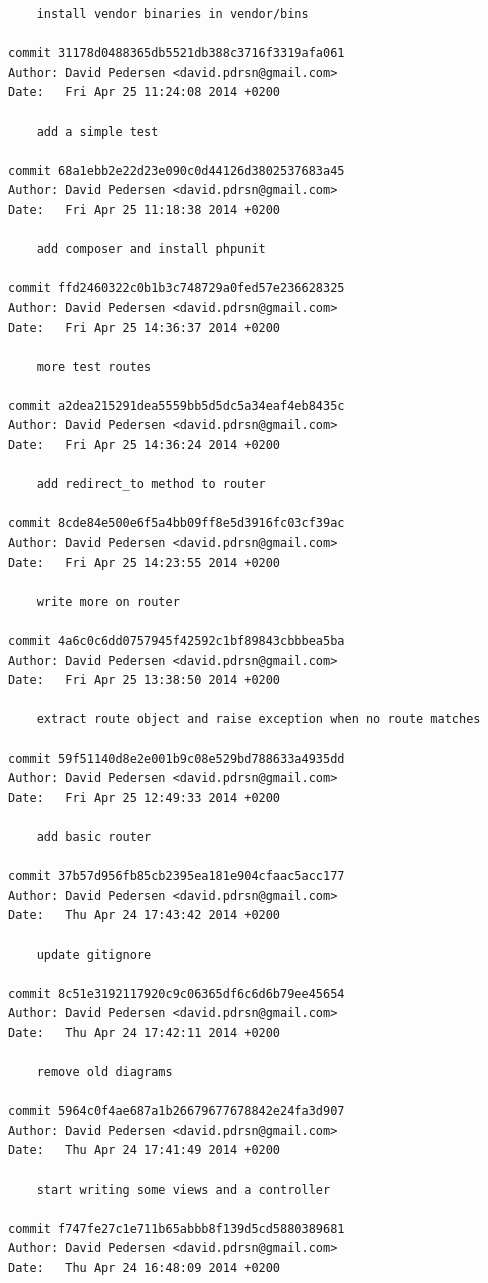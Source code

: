 \documentclass[12pt]{article}
\begin{document}
\begin{verbatim}
    install vendor binaries in vendor/bins

commit 31178d0488365db5521db388c3716f3319afa061
Author: David Pedersen <david.pdrsn@gmail.com>
Date:   Fri Apr 25 11:24:08 2014 +0200

    add a simple test

commit 68a1ebb2e22d23e090c0d44126d3802537683a45
Author: David Pedersen <david.pdrsn@gmail.com>
Date:   Fri Apr 25 11:18:38 2014 +0200

    add composer and install phpunit

commit ffd2460322c0b1b3c748729a0fed57e236628325
Author: David Pedersen <david.pdrsn@gmail.com>
Date:   Fri Apr 25 14:36:37 2014 +0200

    more test routes

commit a2dea215291dea5559bb5d5dc5a34eaf4eb8435c
Author: David Pedersen <david.pdrsn@gmail.com>
Date:   Fri Apr 25 14:36:24 2014 +0200

    add redirect_to method to router

commit 8cde84e500e6f5a4bb09ff8e5d3916fc03cf39ac
Author: David Pedersen <david.pdrsn@gmail.com>
Date:   Fri Apr 25 14:23:55 2014 +0200

    write more on router

commit 4a6c0c6dd0757945f42592c1bf89843cbbbea5ba
Author: David Pedersen <david.pdrsn@gmail.com>
Date:   Fri Apr 25 13:38:50 2014 +0200

    extract route object and raise exception when no route matches

commit 59f51140d8e2e001b9c08e529bd788633a4935dd
Author: David Pedersen <david.pdrsn@gmail.com>
Date:   Fri Apr 25 12:49:33 2014 +0200

    add basic router

commit 37b57d956fb85cb2395ea181e904cfaac5acc177
Author: David Pedersen <david.pdrsn@gmail.com>
Date:   Thu Apr 24 17:43:42 2014 +0200

    update gitignore

commit 8c51e3192117920c9c06365df6c6d6b79ee45654
Author: David Pedersen <david.pdrsn@gmail.com>
Date:   Thu Apr 24 17:42:11 2014 +0200

    remove old diagrams

commit 5964c0f4ae687a1b26679677678842e24fa3d907
Author: David Pedersen <david.pdrsn@gmail.com>
Date:   Thu Apr 24 17:41:49 2014 +0200

    start writing some views and a controller

commit f747fe27c1e711b65abbb8f139d5cd5880389681
Author: David Pedersen <david.pdrsn@gmail.com>
Date:   Thu Apr 24 16:48:09 2014 +0200


\end{verbatim}
\end{document}
